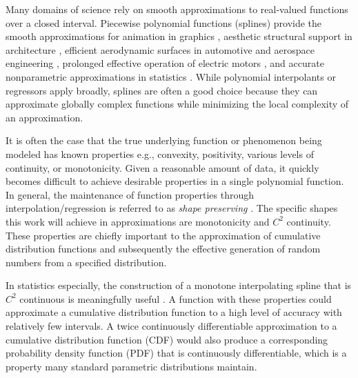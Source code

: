 \documentclass{scspaperproc}
\theoremstyle{scsthe}
\begin{document}


Many domains of science rely on smooth approximations to real-valued functions over a closed interval. Piecewise polynomial functions (splines) provide the smooth approximations for animation in graphics \cite{herman2015techniques,quint2003scalable}, aesthetic structural support in architecture \cite{brennan2019measure}, efficient aerodynamic surfaces in automotive and aerospace engineering \cite{brennan2019measure}, prolonged effective operation of electric motors , and accurate nonparametric approximations in statistics \cite{knott2012interpolating}. While polynomial interpolants or regressors apply broadly, splines are often a good choice because they can approximate globally complex functions while minimizing the local complexity of an approximation.

It is often the case that the true underlying function or phenomenon being modeled has known properties e.g., convexity, positivity, various levels of continuity, or monotonicity. Given a reasonable amount of data, it quickly becomes difficult to achieve desirable properties in a single polynomial function. In general, the maintenance of function properties through interpolation/regression is referred to as \textit{shape preserving} \cite{fritsch1980monotone,gregory1985shape}. The specific shapes this work will achieve in approximations are monotonicity and $C^2$ continuity. These properties are chiefly important to the approximation of cumulative distribution functions and subsequently the effective generation of random numbers from a specified distribution.

In statistics especially, the construction of a monotone interpolating spline that is $C^2$ continuous is meaningfully useful \cite{ramsay1988monotone}. A function with these properties could approximate a cumulative distribution function to a high level of accuracy with relatively few intervals. A twice continuously differentiable approximation to a cumulative distribution function (CDF) would also produce a corresponding probability density function (PDF) that is continuously differentiable, which is a property many standard parametric distributions maintain.
\end{document}

